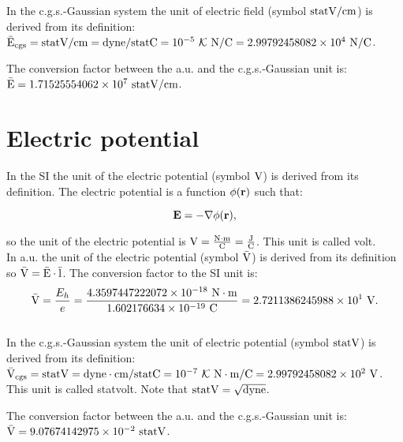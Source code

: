 \documentclass[12pt,a4paper,twoside]{report}
\def\baru{4.3597447222072\times 10^{-18}}
\def\barc{1.602176634\times 10^{-19}}
\def\barphi{2.7211386245988\times 10^{1}}
\def\etoe{2.99792458082\times 10^{4}}
\def\phitophi{2.99792458082\times 10^{2}}
\def\barecgs{1.71525554062\times 10^{7}}
\def\barphicgs{9.07674142975\times 10^{-2}}
\begin{document}
{{\color{orange} In the c.g.s.-Gaussian system the unit of electric field
(symbol ${\rm statV}/{\rm cm}$) is derived from its definition:
${\rm \bar E_{cgs}}={\rm statV}/{\rm cm}={\rm dyne} / {\rm statC} = {10^{-5}\ \mathcal{K} }\ {\rm N}/{\rm C}=\etoe\ {\rm N}/{\rm C}$. 
\\
}

{\color{green} 
The conversion factor between the a.u. and the c.g.s.-Gaussian unit
is: ${\rm \bar E} = \barecgs \ {\rm statV}/{\rm cm}$.
}

\newpage
{\color{coral}\section{Electric potential}}
\color{black}
In the SI the unit of the electric potential (symbol ${\rm V}$)
is derived from its definition. The electric 
potential is a function $\phi({\bf r})$ such that:

\begin{tcolorbox}
\begin{equation}
{\bf E}=- \nabla \phi({\bf r}),
\end{equation}
\end{tcolorbox}

so the unit of the electric potential is ${\rm V}={{\rm N} \cdot {\rm m} \over {\rm C}}={{\rm J}\over {\rm C}}$. 
This unit is called volt.
\\

{\color{web-blue} In a.u. the unit of the electric potential 
(symbol ${\rm \bar V}$) 
is derived from its definition so ${\rm \bar V}={{\rm \bar E} \cdot {\rm \bar l}}$. 
The conversion factor to the SI unit is:
\begin{equation}
{\rm \bar V}= {E_h\over e}=
{\baru\ {\rm N}\cdot {\rm m}\over \barc\ {\rm C}} =\barphi\ {\rm V}.
\end{equation}
}
\\

{\color{orange} In the c.g.s.-Gaussian system the unit of electric potential
(symbol ${\rm statV}$) is derived from its definition: 
${\rm \bar V_{cgs}}={\rm statV}={\rm dyne}\cdot {\rm cm} / {\rm statC} = {10^{-7}\ \mathcal{K}}\ {\rm N}\cdot {\rm m}/{\rm C}=\phitophi\ {\rm V}$. This unit
is called statvolt. Note that 
${\rm statV}=\sqrt{\rm dyne}$.
\\
}

{\color{green} 
The conversion factor between the a.u. and the c.g.s.-Gaussian unit
is:
${\rm \bar V} = \barphicgs \ {\rm statV}$.
}
\\

}
\end{document}
